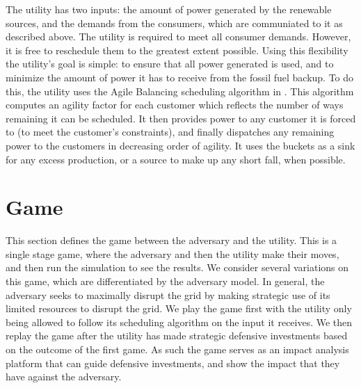 \documentclass[conference]{IEEEtran}
\begin{document}
The utility has two inputs: the amount of power generated by the renewable sources, and the demands from the consumers, which are communiated to it as described above. The utility is required to meet all consumer demands. However, it is free to reschedule them to the greatest extent possible. Using this flexibility the utility's goal is simple: to ensure that all power generated is used, and to minimize the amount of power it has to receive from the fossil fuel backup. To do this, the utility uses the Agile Balancing scheduling algorithm in \cite{petersen2013taxonomy}. This algorithm computes an agility factor for each customer which reflects the number of ways remaining it can be scheduled.  It then provides power to any customer it is forced to (to meet the customer's constraints), and finally dispatches any remaining power to the customers in decreasing order of agility.  It uses the buckets as a sink for any excess production, or a source to make up any short fall, when possible.

\section{Game}
\label{Game}

This section defines the game between the adversary and the utility. This is a single stage game, where the adversary and then the utility make their moves, and then run the simulation to see the results. We consider several variations on this game, which are differentiated by the adversary model. In general, the adversary seeks to maximally disrupt the grid by making strategic use of its limited resources to disrupt the grid. We play the game first with the utility only being allowed to follow its scheduling algorithm on the input it receives. We then replay the game after the utility has made strategic defensive investments based on the outcome of the first game. As such the game serves as an impact analysis platform that can guide defensive investments, and show the impact that they have against the adversary.  
\end{document}
